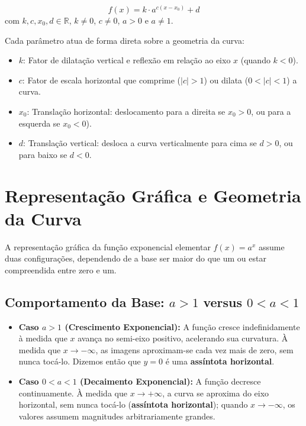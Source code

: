 \documentclass[12pt,a4paper]{report}
\begin{document}
	\begin{destaque}
		\label{dest:forma_geral_param}
		$$f(x) = k \cdot a^{c(x - x_0)} + d$$
		com $k, c, x_0, d \in \mathbb{R}$, $k \neq 0$, $c \neq 0$, $a > 0$ e $a \neq 1$.
	\end{destaque}
	
	Cada parâmetro atua de forma direta sobre a geometria da curva:
	\begin{itemize}
		\item $k$: Fator de dilatação vertical e reflexão em relação ao eixo $x$ (quando $k < 0$).
		\item $c$: Fator de escala horizontal que comprime ($|c| > 1$) ou dilata ($0 < |c| < 1$) a curva.
		\item $x_0$: Translação horizontal: deslocamento para a direita se $x_0 > 0$, ou para a esquerda se $x_0 < 0$).
		\item $d$: Translação vertical: desloca a curva verticalmente para cima se $d>0$, ou para baixo se $d<0$.
	\end{itemize}
	
	\chapter{Representação Gráfica e Geometria da Curva}
	\label{sec:grafico_exp}
	
	A representação gráfica da função exponencial elementar $f(x) = a^x$ assume duas configurações, dependendo de a base ser maior do que um ou estar compreendida entre zero e um.
	
	\section{Comportamento da Base: $a > 1$ versus $0 < a < 1$}
	\label{subsec:base_comparacao}
	
	\begin{itemize}
		\item \textbf{Caso $a > 1$ (Crescimento Exponencial):} A função cresce indefinidamente à medida que $x$ avança no semi-eixo positivo, acelerando sua curvatura. À medida que $x \to -\infty$, as imagens aproximam-se cada vez mais de zero, sem nunca tocá-lo. Dizemos então que $y=0$ é uma \textbf{assíntota horizontal}.
		\item \textbf{Caso $0 < a < 1$ (Decaimento Exponencial):} A função decresce continuamente. À medida que $x \to +\infty$, a curva se aproxima do eixo horizontal, sem nunca tocá-lo (\textbf{assíntota horizontal}); quando $x \to -\infty$, os valores assumem magnitudes arbitrariamente grandes.
	\end{itemize}
	
\end{document}
